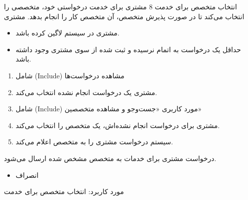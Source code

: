 {
\usecase
{انتخاب متخصص برای خدمت}
{8}
{مشتری برای خدمت درخواستی خود، متخصصی را انتخاب می‌کند تا در صورت پذیرش متخصص، آن متخصص کار را انجام بدهد.}
{مشتری}
{}
{	
	\begin{itemize}
		\vspace*{-0.6cm}
		\item 
		مشتری در سیستم لاگین کرده باشد.
		\item
		حداقل یک درخواست به اتمام نرسیده و ثبت شده از سوی مشتری وجود داشته باشد.
	\end{itemize}
}
{
	\vspace*{-0.6cm}
	\begin{enumerate}
		\item 
		شامل (Include) مشاهده درخواست‌ها
			\item 
مشتری یک درخواست انجام نشده انتخاب می‌کند.
	\item
	شامل ({Include}) مورد کاربری «جست‌وجو و مشاهده متخصصین»
	\item
	 مشتری برای درخواست انجام نشده‌اش، یک متخصص را انتخاب می‌کند.
	\item
	سیستم درخواست مشتری را به متخصص اعلام می‌کند.
	\end{enumerate}
}
{
درخواست مشتری برای خدمات به متخصص مشخص شده ارسال می‌شود.
}
{
	\begin{itemize}
		\item
		انصراف
	\end{itemize}
}
{
	مورد کاربرد: انتخاب متخصص برای خدمت
}

}



